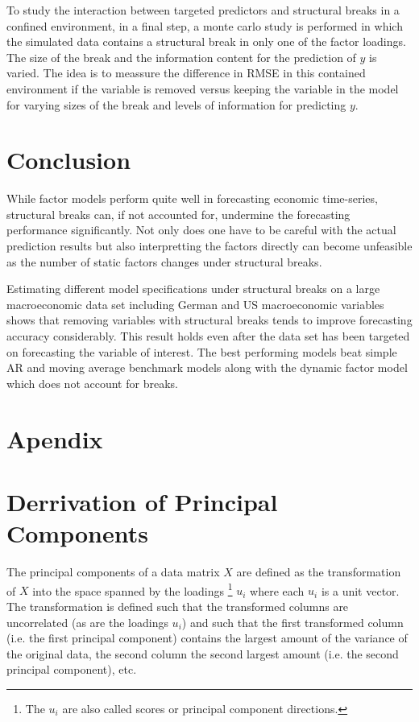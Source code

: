 \documentclass[12pt]{article}
\begin{document}
To study the interaction between targeted predictors and structural breaks in a confined environment, in a final step, a monte carlo study is performed in which the simulated data contains a structural break in only one of the factor loadings. The size of the break and the information content for the prediction of $y$ is varied. The idea is to meassure the difference in RMSE in this contained environment if the variable is removed versus keeping the variable in the model for varying sizes of the break and levels of information for predicting $y$.


\clearpage
\section{Conclusion}
While factor models perform quite well in forecasting economic time-series, structural breaks can, if not accounted for, undermine the forecasting performance significantly. Not only does one have to be careful with the actual prediction results but also interpretting the factors directly can become unfeasible as the number of static factors changes under structural breaks.

Estimating different model specifications under structural breaks on a large macroeconomic data set including German and US macroeconomic variables shows that removing variables with structural breaks tends to improve forecasting accuracy considerably. This result holds even after the data set has been targeted on forecasting the variable of interest. The best performing models beat simple AR and moving average benchmark models along with the dynamic factor model which does not account for breaks.


\clearpage
\newpage
\appendix
\section*{Apendix}

\section{Derrivation of Principal Components}
\label{Derrivation of Principal Components}
The principal components of a data matrix $X$ are defined as the transformation of $X$ into the space spanned by the loadings \footnote{The $u_i$ are also called scores or principal component directions.} $u_i$ where each $u_i$ is a unit vector. The transformation is defined such that the transformed columns are uncorrelated (as are the loadings $u_i$) and such that the first transformed column (i.e. the first principal component) contains the largest amount of the variance of the original data, the second column the second largest amount (i.e. the second principal component), etc. \\
\end{document}
